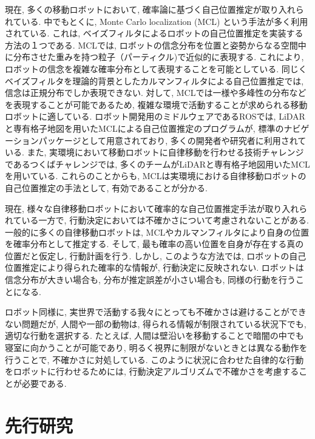 現在, 多くの移動ロボットにおいて, 確率論に基づく自己位置推定が取り入れられている. 
中でもとくに, Monte Carlo localization (MCL) という手法が多く利用されている\cite{dellaert1999, fox1999}. 
これは, ベイズフィルタによるロボットの自己位置推定を実装する方法の１つである. 
MCLでは, ロボットの信念分布を位置と姿勢からなる空間中に分布させた重みを持つ粒子（パーティクル)で近似的に表現する. 
これにより, ロボットの信念を複雑な確率分布として表現することを可能としている. 
同じくベイズフィルタを理論的背景としたカルマンフィルタによる自己位置推定では, 信念は正規分布でしか表現できない\cite{kalman1960}. 
対して, MCLでは一様や多峰性の分布などを表現することが可能であるため, 複雑な環境で活動することが求められる移動ロボットに適している. 
ロボット開発用のミドルウェアであるROSでは, LiDARと専有格子地図を用いたMCLによる自己位置推定のプログラムが, 標準のナビゲーションパッケージとして用意されており, 多くの開発者や研究者に利用されている\cite{quigley2009ros,roswiki_amcl}. 
また, 実環境において移動ロボットに自律移動を行わせる技術チャレンジであるつくばチャレンジでは, 多くのチームがLiDARと専有格子地図用いたMCLを用いている. 
\cite{夏迫2016つくばチャレンジ}
これらのことからも, MCLは実環境における自律移動ロボットの自己位置推定の手法として, 有効であることが分かる. 

現在, 様々な自律移動ロボットにおいて確率的な自己位置推定手法が取り入れられている一方で, 行動決定においては不確かさについて考慮されないことがある. 
一般的に多くの自律移動ロボットは, MCLやカルマンフィルタにより自身の位置を確率分布として推定する. 
そして, 最も確率の高い位置を自身が存在する真の位置だと仮定し, 行動計画を行う. 
しかし, このような方法では, ロボットの自己位置推定により得られた確率的な情報が, 行動決定に反映されない. 
ロボットは信念分布が大きい場合も, 分布が推定誤差が小さい場合も, 同様の行動を行うことになる. 

ロボット同様に, 実世界で活動する我々にとっても不確かさは避けることができない問題だが, 
人間や一部の動物は, 得られる情報が制限されている状況下でも, 適切な行動を選択する. 
たとえば, 人間は壁沿いを移動することで暗闇の中でも寝室に向かうことが可能であり, 
明るく視界に制限がないときとは異なる動作を行うことで, 不確かさに対処している. 
このように状況に合わせた自律的な行動をロボットに行わせるためには, 行動決定アルゴリズムで不確かさを考慮することが必要である. 


\section{先行研究} \label{section:related works}

